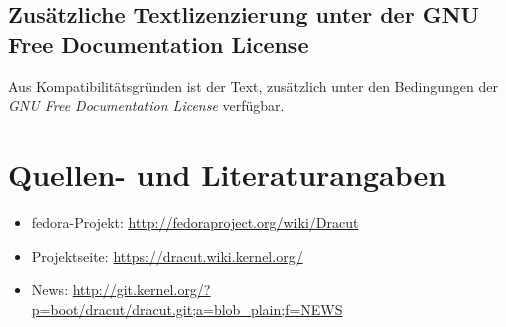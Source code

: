 \documentclass[10pt,a4paper]{article}
\begin{document}
\subsection{Zusätzliche Textlizenzierung unter der GNU Free Documentation License}

Aus Kompatibilitätsgründen ist der Text, zusätzlich unter den Bedingungen der
\textit{GNU Free Documentation License} verfügbar.


\section{Quellen- und Literaturangaben}
\label{sec:quell}

\begin{itemize}
 \item fedora-Projekt: \url{http://fedoraproject.org/wiki/Dracut}
 \item Projektseite: \url{https://dracut.wiki.kernel.org/}
 \item News: \url{http://git.kernel.org/?p=boot/dracut/dracut.git;a=blob_plain;f=NEWS}
\end{itemize}
\end{document}
